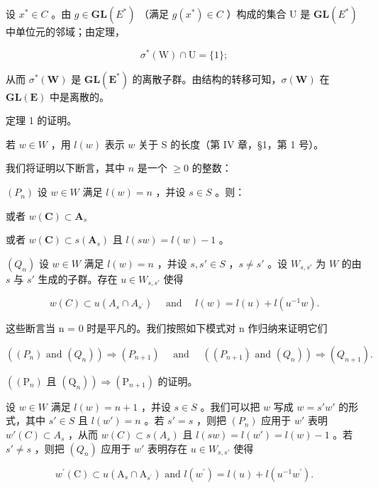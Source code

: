 设 \(x^{*} \in C\) 。由 \(g \in \mathbf{GL}(E^{*})\) （满足 \(g(x^{*}) \in C\) ）构成的集合 U 是 \(\mathbf{GL}(E^{*})\) 中单位元的邻域；由定理，

\[
\sigma^ {*} (\mathrm{W}) \cap \mathrm{U} = \{1 \};
\]

从而 \(\sigma^{*}(\mathbf{W})\) 是 \(\mathbf{GL}(\mathbf{E}^{*})\) 的离散子群。由结构的转移可知，\(\sigma(\mathbf{W})\) 在 \(\mathbf{GL}(\mathbf{E})\) 中是离散的。

定理 1 的证明。

若 \(w \in W\) ，用 \(l(w)\) 表示 \(w\) 关于 S 的长度（第 IV 章，§1，第 1 号）。

我们将证明以下断言，其中 \(n\) 是一个 \(\geqslant 0\) 的整数：

\((P_n)\) 设 \(w \in W\) 满足 \(l(w) = n\) ，并设 \(s \in S\) 。则：

或者 \(w(\mathbf{C})\subset \mathbf{A}_s\)

或者 \(w(\mathbf{C}) \subset s(\mathbf{A}_s)\) 且 \(l(sw) = l(w) - 1\) 。

\((Q_n)\) 设 \(w \in W\) 满足 \(l(w) = n\) ，并设 \(s, s' \in S\) ，\(s \neq s'\) 。设 \(W_{s,s'}\) 为 \(W\) 的由 \(s\) 与 \(s'\) 生成的子群。存在 \(u \in W_{s,s'}\) 使得

\[
w (C) \subset u \left(A _ {s} \cap A _ {s ^ {\prime}}\right) \quad \text { and } \quad l (w) = l (u) + l \left(u ^ {- 1} w\right).
\]

这些断言当 n = 0 时是平凡的。我们按照如下模式对 n 作归纳来证明它们

\[
\left(\left(P _ {n}\right) \text {   and   } \left(Q _ {n}\right)\right) \Longrightarrow \left(P _ {n + 1}\right) \quad \text { and } \quad \left(\left(P _ {n + 1}\right) \text {   and   } \left(Q _ {n}\right)\right) \Longrightarrow \left(Q _ {n + 1}\right).
\]

\(\left((\mathrm{P}_n)\text{ 且 } (\mathrm{Q}_n)\right) \Longrightarrow (\mathrm{P}_{n+1})\) 的证明。

设 \(w \in W\) 满足 \(l(w) = n + 1\) ，并设 \(s \in S\) 。我们可以把 \(w\) 写成 \(w = s'w'\) 的形式，其中 \(s' \in S\) 且 \(l(w') = n\) 。若 \(s' = s\) ，则把 \((P_n)\) 应用于 \(w'\) 表明 \(w'(C) \subset A_s\) ，从而 \(w(C) \subset s(A_s)\) 且 \(l(sw) = l(w') = l(w) - 1\) 。若 \(s' \neq s\) ，则把 \((Q_n)\) 应用于 \(w'\) 表明存在 \(u \in W_{s,s'}\) 使得

\[
w ^ {\prime} (\mathrm{C}) \subset u \left(\mathrm{A} _ {s} \cap \mathrm{A} _ {s ^ {\prime}}\right) \text { and } l \left(w ^ {\prime}\right) = l (u) + l \left(u ^ {- 1} w ^ {\prime}\right).
\]

